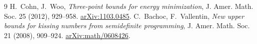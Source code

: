 \documentclass[11pt]{article}
\theoremstyle{definition}
\begin{document}
\begin{thebibliography}{9}
 H.~Cohn, J.~Woo, \emph{Three-point bounds for energy minimization}, J. Amer. Math. Soc. 25 (2012), 929--958. \href{https://arxiv.org/abs/1103.0485}{arXiv:1103.0485}.
 C.~Bachoc, F.~Vallentin, \emph{New upper bounds for kissing numbers from semidefinite programming},
J. Amer. Math. Soc. 21 (2008), 909--924. \href{https://arxiv.org/abs/math/0608426}{arXiv:math/0608426}.
\end{thebibliography}
\end{document}

